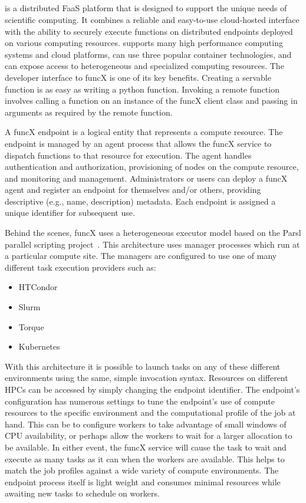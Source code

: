 \subsection{\funcX{}}\label{subsec:funcX}
\funcX{} is a distributed FaaS platform that is designed to support the unique needs of scientific computing. It combines a reliable and easy-to-use cloud-hosted interface with the ability to securely execute functions on distributed endpoints deployed on various computing resources. \funcX{} supports many high performance computing systems and cloud platforms, can use three popular container technologies, and can expose access to heterogeneous and specialized computing resources. The developer interface to funcX is one of its key benefits. Creating a servable function is as easy as writing a python function. Invoking a remote function involves calling a function on an instance of the funcX client class and passing in arguments as required by the remote function.

A funcX endpoint is a logical entity that represents a compute resource. The endpoint is managed by an agent process that allows the funcX service to dispatch functions to that resource for execution. The agent handles authentication and authorization, provisioning of nodes on the compute resource, and monitoring and management. Administrators or users can deploy a funcX agent and register an endpoint for themselves and/or others, providing descriptive (e.g., name, description) metadata. Each endpoint is assigned a unique identifier for subsequent use.

Behind the scenes, funcX uses a heterogeneous executor model based on the Parsl parallel scripting project~\cite{Parsl_paper}.  This architecture uses manager processes which run at a particular compute site. The managers are configured to use one of many different task execution providers such as:
\begin{itemize}
\item HTCondor
\item Slurm
\item Torque
\item Kubernetes
\end{itemize}

With this architecture it is possible to launch tasks on any of these different environments using the same, simple invocation syntax. Resources on different HPCs can be accessed by simply changing the endpoint identifier. The endpoint's configuration has numerous settings to tune the endpoint's use of compute resources to the specific environment and the computational profile of the job at hand. This can be to configure workers to take advantage of small windows of CPU availability, or perhaps allow the workers to wait for a larger allocation to be available. In either event, the funcX service will cause the task to wait and execute as many tasks as it can when the workers are available.  This helps to match the job profiles against a wide variety of compute environments. The endpoint process itself is light weight and consumes minimal resources while awaiting new tasks to schedule on workers.

